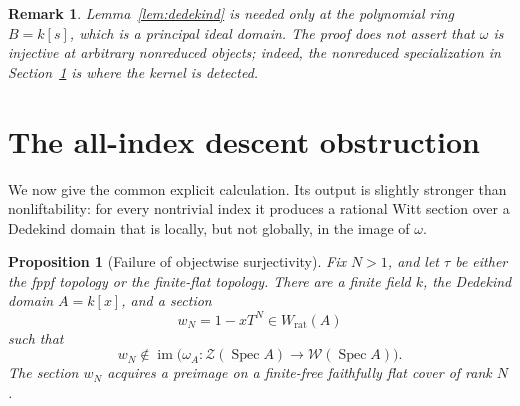 \documentclass[11pt]{article}
\newtheorem{proposition}[theorem]{Proposition}
\newtheorem{remark}[theorem]{Remark}
\theoremstyle{definition}
\newcommand{\Spec}{\operatorname{Spec}}
\newcommand{\Wrat}{W_{\mathrm{rat}}}
\newcommand{\Zsh}{\mathcal Z}
\newcommand{\Wsh}{\mathcal W}
\begin{document}
\begin{remark}\label{rem:scope-site}
Lemma~\ref{lem:dedekind} is needed only at the polynomial ring
\(B=k[s]\), which is a principal ideal domain.  The proof does not assert
that \(\omega\) is injective at arbitrary nonreduced objects; indeed, the
nonreduced specialization in Section~\ref{sec:obstruction} is where the
kernel is detected.
\end{remark}

\section{The all-index descent obstruction}\label{sec:obstruction}

We now give the common explicit calculation.  Its output is slightly
stronger than nonliftability: for every nontrivial index it produces a
rational Witt section over a Dedekind domain that is locally, but not
globally, in the image of \(\omega\).

\begin{proposition}[Failure of objectwise surjectivity]\label{prop:failure}
Fix \(N>1\), and let \(\tau\) be either the fppf topology or the
finite-flat topology.  There are a finite field \(k\), the Dedekind domain
\(A=k[x]\), and a section
\[
 w_N=1-xT^N\in\Wrat(A)
\]
such that
\[
 w_N\notin
 \operatorname{im}\bigl(\omega_A\colon
 \Zsh(\Spec A)\longrightarrow\Wsh(\Spec A)\bigr).
\]
The section \(w_N\) acquires a preimage on a finite-free faithfully flat
cover of rank \(N\).
\end{proposition}
\end{document}
